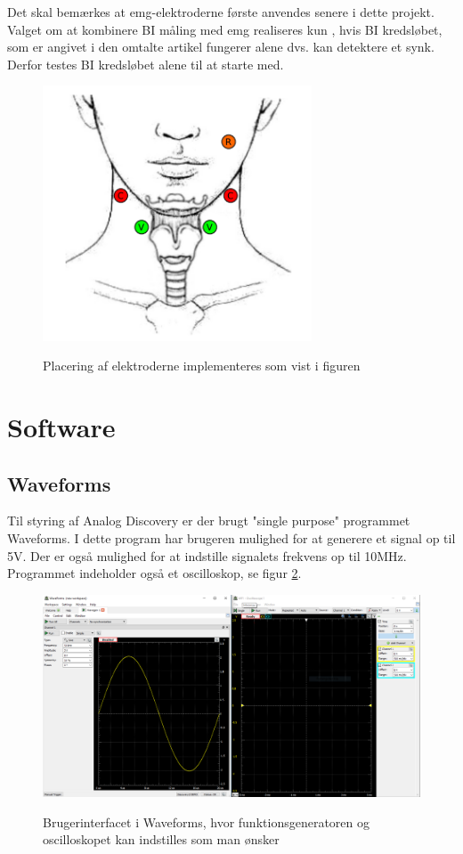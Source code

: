 Det skal bemærkes at emg-elektroderne første anvendes senere i dette projekt. Valget om at kombinere BI måling med emg realiseres kun , hvis BI kredsløbet, som er angivet i den omtalte artikel fungerer alene dvs. kan detektere et synk. Derfor testes BI kredsløbet alene til at starte med. 


\begin{figure}[H]
\centering
{\includegraphics[width=8cm]
{Figure/elektrodeplaceringREF}}
\caption{Placering af elektroderne implementeres som vist i figuren \cite{Nahrstaedt2012a}}
\label{fig:elektrodeplaceringREF}
\end{figure}







\section{Software}
\subsection{Waveforms}

Til styring af Analog Discovery er der brugt "single purpose"  programmet  Waveforms. I dette program har brugeren mulighed for at generere et signal op til 5V. Der er også mulighed for at indstille signalets frekvens op til 10MHz. Programmet indeholder også et oscilloskop, se figur \ref{fig:waveforms}. 

\begin{figure}[H]
\centering
{\includegraphics[width=14cm]
{Figure/waveforms}}
\caption{Brugerinterfacet i Waveforms, hvor funktionsgeneratoren og oscilloskopet kan indstilles som man ønsker}
\label{fig:waveforms}
\end{figure}


